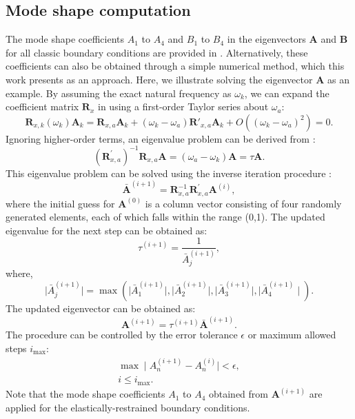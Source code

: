 \documentclass[preprint,12pt,number]{elsarticle}
\begin{document}
\subsection{Mode shape computation}\label{sec:Mode shape}
The mode shape coefficients $ A_1 $ to $ A_4 $ and $ B_1 $ to $ B_4$ in the eigenvectors $\mathbf{A}$ and $\mathbf{B}$ for all classic boundary conditions are provided in \cite{xing2020extended,xing2020improved}. 
Alternatively, these coefficients can also be obtained through a simple numerical method, which this work presents as an approach.
Here, we illustrate solving the eigenvector $\mathbf{A}$ as an example.
By assuming the exact natural frequency as $\omega_k$, we can expand the coefficient matrix $ \mathbf{R}_{x} $ in  using a first-order Taylor series about $\omega_a$:
%
\begin{equation}\label{eq:Taylor}
\mathbf{R}_{x,k}(\omega_k)\mathbf{A}_k = \mathbf{R}_{x,a}\mathbf{A}_k + (\omega_k - \omega_a)\mathbf{R}'_{x,a}\mathbf{A}_k + O\left((\omega_k - \omega_a)^2\right) = 0.
\end{equation}
%
Ignoring higher-order terms, an eigenvalue problem can be derived from :
%
\begin{equation}\label{eq:Newgeigen}
(\mathbf{R}^{'}_{x,a})^{-1} \mathbf{R}_{x,a} \mathbf{A} = (\omega_a - \omega_k)\mathbf{A} = \tau \mathbf{A}.
\end{equation}
%
This eigenvalue problem can be solved using the inverse iteration procedure \cite{yuan2004second}:
%
\begin{equation}\label{eq:Inversepower}
\bar{\mathbf{A}}^{(i+1)} = \mathbf{R}_{x,a}^{-1} \mathbf{R}^{'}_{x,a} \mathbf{A}^{(i)},	
\end{equation}
%
where the initial guess for $\mathbf{A}^{(0)}$ is a column vector consisting of four randomly generated elements, each of which falls within the range (0,1). The updated eigenvalue for the next step can be obtained as:
%
\begin{equation}\label{eq:Newgeigenvalue}
\tau^{(i+1)} = \frac{1}{\bar{A}_j^{(i+1)}},
\end{equation}
%
where,
%
\begin{equation}\label{eq:updatetau}
\mid \bar{A}_j^{(i+1)} \mid = \max(\mid \bar{A}_1^{(i+1)} \mid, \mid \bar{A}_2^{(i+1)} \mid, \mid\bar{A}_3^{(i+1)}\mid , \mid \bar{A}_4^{(i+1)} \mid).
\end{equation}
%
The updated eigenvector can be obtained as:
%
\begin{equation}\label{eq:updateeigenvalue}
\mathbf{A}^{(i+1)} = \tau^{(i+1)} \bar{\mathbf{A}}^{(i+1)}.
\end{equation}
%
The procedure can be controlled by the error tolerance \( \epsilon \) or maximum allowed steps \( i_{\text{max}} \):
%
\begin{subequations}
\begin{align}
	\max \mid A_n^{(i+1)} - A_n^{(i)} \mid < \epsilon, \\ 
	i \le i_{\text{max}}.
\end{align}
\end{subequations}
%
Note that the mode shape coefficients $A_1$ to $A_4$ obtained from $\mathbf{A}^{(i+1)}$ are applied for the elastically-restrained boundary conditions.
\end{document}
